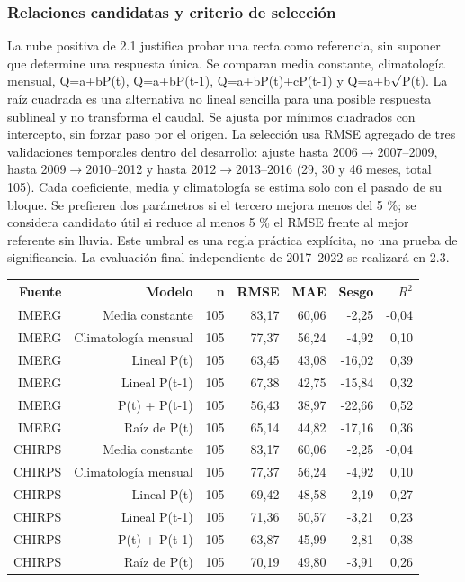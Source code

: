 \documentclass[10pt,a4paper]{article}
\begin{document}
\subsubsection*{Relaciones candidatas y criterio de selección}
La nube positiva de 2.1 justifica probar una recta como referencia, sin suponer que determine una respuesta única. Se comparan media constante, climatología mensual, Q=a+bP(t), Q=a+bP(t-1), Q=a+bP(t)+cP(t-1) y Q=a+b$\sqrt{\vphantom{P}}$P(t). La raíz cuadrada es una alternativa no lineal sencilla para una posible respuesta sublineal y no transforma el caudal. Se ajusta por mínimos cuadrados con intercepto, sin forzar paso por el origen. La selección usa RMSE agregado de tres validaciones temporales dentro del desarrollo: ajuste hasta 2006$\rightarrow$2007--2009, hasta 2009$\rightarrow$2010--2012 y hasta 2012$\rightarrow$2013--2016 (29, 30 y 46 meses, total 105). Cada coeficiente, media y climatología se estima solo con el pasado de su bloque. Se prefieren dos parámetros si el tercero mejora menos del 5 \%; se considera candidato útil si reduce al menos 5 \% el RMSE frente al mejor referente sin lluvia. Este umbral es una regla práctica explícita, no una prueba de significancia. La evaluación final independiente de 2017--2022 se realizará en 2.3.
\begin{center}\small\begin{tabular}{rrrrrrr}\hline
Fuente & Modelo & n & RMSE & MAE & Sesgo & $R^2$ \\ \hline
IMERG & Media constante & 105 & 83,17 & 60,06 & -2,25 & -0,04 \\
IMERG & Climatología mensual & 105 & 77,37 & 56,24 & -4,92 & 0,10 \\
IMERG & Lineal P(t) & 105 & 63,45 & 43,08 & -16,02 & 0,39 \\
IMERG & Lineal P(t-1) & 105 & 67,38 & 42,75 & -15,84 & 0,32 \\
IMERG & P(t) + P(t-1) & 105 & 56,43 & 38,97 & -22,66 & 0,52 \\
IMERG & Raíz de P(t) & 105 & 65,14 & 44,82 & -17,16 & 0,36 \\
CHIRPS & Media constante & 105 & 83,17 & 60,06 & -2,25 & -0,04 \\
CHIRPS & Climatología mensual & 105 & 77,37 & 56,24 & -4,92 & 0,10 \\
CHIRPS & Lineal P(t) & 105 & 69,42 & 48,58 & -2,19 & 0,27 \\
CHIRPS & Lineal P(t-1) & 105 & 71,36 & 50,57 & -3,21 & 0,23 \\
CHIRPS & P(t) + P(t-1) & 105 & 63,87 & 45,99 & -2,81 & 0,38 \\
CHIRPS & Raíz de P(t) & 105 & 70,19 & 49,80 & -3,91 & 0,26 \\
\hline\end{tabular}\end{center}
\end{document}
